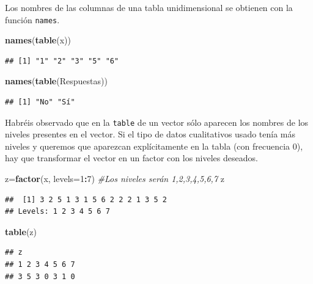 \documentclass[]{book}
\newenvironment{Shaded}{\begin{snugshade}}{\end{snugshade}}
\newcommand{\CommentTok}[1]{\textcolor[rgb]{0.56,0.35,0.01}{\textit{#1}}}
\newcommand{\DataTypeTok}[1]{\textcolor[rgb]{0.13,0.29,0.53}{#1}}
\newcommand{\DecValTok}[1]{\textcolor[rgb]{0.00,0.00,0.81}{#1}}
\newcommand{\KeywordTok}[1]{\textcolor[rgb]{0.13,0.29,0.53}{\textbf{#1}}}
\newcommand{\NormalTok}[1]{#1}
\newcommand{\OperatorTok}[1]{\textcolor[rgb]{0.81,0.36,0.00}{\textbf{#1}}}
\theoremstyle{definition}
\theoremstyle{definition}
\theoremstyle{definition}
\theoremstyle{remark}
\begin{document}
Los nombres de las columnas de una tabla unidimensional se obtienen con la función \texttt{names}.

\begin{Shaded}
\begin{Highlighting}[]
\KeywordTok{names}\NormalTok{(}\KeywordTok{table}\NormalTok{(x))}
\end{Highlighting}
\end{Shaded}

\begin{verbatim}
## [1] "1" "2" "3" "5" "6"
\end{verbatim}

\begin{Shaded}
\begin{Highlighting}[]
\KeywordTok{names}\NormalTok{(}\KeywordTok{table}\NormalTok{(Respuestas))}
\end{Highlighting}
\end{Shaded}

\begin{verbatim}
## [1] "No" "Sí"
\end{verbatim}

Habréis observado que en la \texttt{table} de un vector sólo aparecen los nombres de los niveles presentes en el vector. Si el tipo de datos cualitativos usado tenía más niveles y queremos que aparezcan explícitamente en la tabla (con frecuencia 0), hay que transformar el vector en un factor con los niveles deseados.

\begin{Shaded}
\begin{Highlighting}[]
\NormalTok{z=}\KeywordTok{factor}\NormalTok{(x, }\DataTypeTok{levels=}\DecValTok{1}\OperatorTok{:}\DecValTok{7}\NormalTok{)  }\CommentTok{#Los niveles serán 1,2,3,4,5,6,7}
\NormalTok{z}
\end{Highlighting}
\end{Shaded}

\begin{verbatim}
##  [1] 3 2 5 1 3 1 5 6 2 2 2 1 3 5 2
## Levels: 1 2 3 4 5 6 7
\end{verbatim}

\begin{Shaded}
\begin{Highlighting}[]
\KeywordTok{table}\NormalTok{(z)}
\end{Highlighting}
\end{Shaded}

\begin{verbatim}
## z
## 1 2 3 4 5 6 7 
## 3 5 3 0 3 1 0
\end{verbatim}
\end{document}

